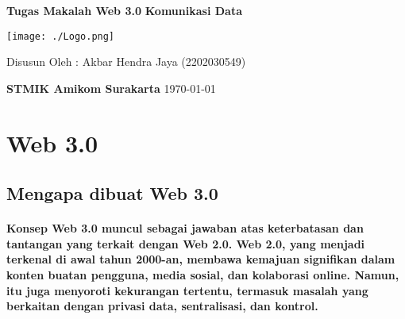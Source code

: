 \documentclass[a4paper]{article}
\title{\Title}
\author{\Author}
\def\Title{Tugas Makalah Web 3.0}
\def\Lecture{Komunikasi Data}
\def\Campus{STMIK Amikom Surakarta}
\begin{document}
\begin{center}
      \Huge
      \textbf{\Title}
      \linebreak
      \Large
      \textbf{\Lecture}
      \linebreak
      \linebreak
      \linebreak

      \texttt{[image: ./Logo.png]}
      \linebreak
      \linebreak
      \linebreak

      \Large
      Disusun Oleh :
      \linebreak
      Akbar Hendra Jaya   (2202030549)
      \linebreak
      \linebreak
      \linebreak
      \linebreak
      \linebreak

      \Huge
      \textbf{\Campus}
      \linebreak
      \normalsize
      \today
\end{center}

\pagebreak

\normalsize

\tableofcontents

\pagebreak

\section{Web 3.0}

\subsection{Mengapa dibuat Web 3.0}

\paragraph{
      \normalfont
      Konsep Web 3.0 muncul sebagai jawaban atas keterbatasan dan tantangan yang
      terkait dengan Web 2.0. Web 2.0, yang menjadi terkenal di awal tahun 2000-an,
      membawa kemajuan signifikan dalam konten buatan pengguna, media sosial, dan
      kolaborasi online. Namun, itu juga menyoroti kekurangan tertentu, termasuk
      masalah yang berkaitan dengan privasi data, sentralisasi, dan kontrol.
      \linebreak
      \linebreak
}
\end{document}
